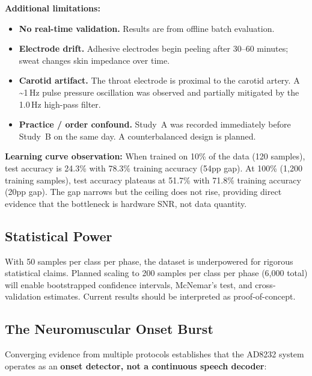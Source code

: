 \documentclass{article}
\begin{document}
\textbf{Additional limitations:}
\begin{itemize}
    \item \textbf{No real-time validation.} Results are from offline batch evaluation.
    \item \textbf{Electrode drift.} Adhesive electrodes begin peeling after 30--60 minutes; sweat changes skin impedance over time.
    \item \textbf{Carotid artifact.} The throat electrode is proximal to the carotid artery. A \textasciitilde1\,Hz pulse pressure oscillation was observed and partially mitigated by the 1.0\,Hz high-pass filter.
    \item \textbf{Practice / order confound.} Study~A was recorded immediately before Study~B on the same day. A counterbalanced design is planned.
\end{itemize}

\textbf{Learning curve observation:} When trained on 10\% of the data (120 samples), test accuracy is 24.3\% with 78.3\% training accuracy (54pp gap). At 100\% (1{,}200 training samples), test accuracy plateaus at 51.7\% with 71.8\% training accuracy (20pp gap). The gap narrows but the ceiling does not rise, providing direct evidence that the bottleneck is hardware SNR, not data quantity.

\subsection{Statistical Power}

With 50 samples per class per phase, the dataset is underpowered for rigorous statistical claims. Planned scaling to 200 samples per class per phase (6{,}000 total) will enable bootstrapped confidence intervals, McNemar's test, and cross-validation estimates. Current results should be interpreted as proof-of-concept.

\subsection{The Neuromuscular Onset Burst}
\label{sec:onset}

Converging evidence from multiple protocols establishes that the AD8232 system operates as an \textbf{onset detector, not a continuous speech decoder}:
\end{document}

